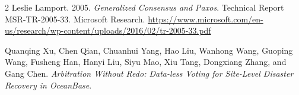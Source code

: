 \documentclass[sigconf,nonacm]{acmart}
\begin{document}
\begin{thebibliography}{2}
Leslie Lamport. 2005.
\newblock \emph{Generalized Consensus and Paxos}.
\newblock Technical Report MSR-TR-2005-33. Microsoft Research.
\newblock \url{https://www.microsoft.com/en-us/research/wp-content/uploads/2016/02/tr-2005-33.pdf}

Quanqing Xu, Chen Qian, Chuanhui Yang, Hao Liu, Wanhong Wang,
Guoping Wang, Fusheng Han, Hanyi Liu, Siyu Mao, Xiu Tang,
Dongxiang Zhang, and Gang Chen.
\newblock \emph{Arbitration Without Redo: Data-less Voting for Site-Level
Disaster Recovery in OceanBase}.
\end{thebibliography}
\end{document}
